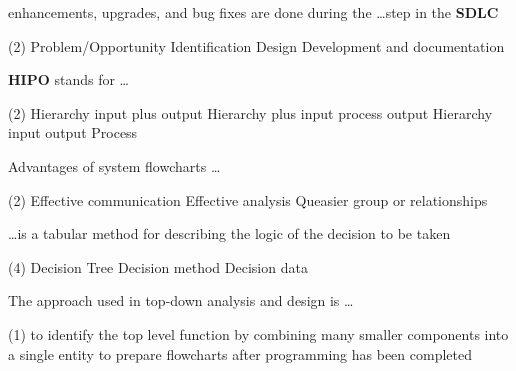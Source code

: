 \documentclass{article}
\begin{document}
\begin{questions}
\begin{exercise}
    \end{exercise}
    \begin{exercise}
        enhancements, upgrades, and bug fixes are done during the \dots step in the \textbf{SDLC}
        \begin{choice}(2)
            \choice {}
            \choice Problem/Opportunity Identification
            \choice Design
            \choice Development and documentation
        \end{choice}
    \end{exercise}
    \begin{exercise}
        \textbf{HIPO} stands for \dots
        \begin{choice}(2)
            \choice {}
            \choice Hierarchy input plus output
            \choice Hierarchy plus input process output
            \choice Hierarchy input output Process
        \end{choice}
    \end{exercise}
    \begin{exercise}
        Advantages of system flowcharts \dots
        \begin{choice}(2)
            \choice Effective communication
            \choice Effective analysis
            \choice Queasier group or relationships
            \choice {}
        \end{choice}
    \end{exercise}
    \begin{exercise}
        \dots is a tabular method for describing the logic of the decision to be taken
        \begin{choice}(4)
            \choice {}
            \choice Decision Tree
            \choice Decision method
            \choice Decision data
        \end{choice}
    \end{exercise}
    \begin{exercise}
        The approach used in top-down analysis and design is \dots
        \begin{choice}(1)
            \choice to identify the top level function by combining many smaller components into a single entity
            \choice to prepare flowcharts after programming has been completed
            \choice {}

\end{choice}
\end{exercise}
\end{questions}
\end{document}
